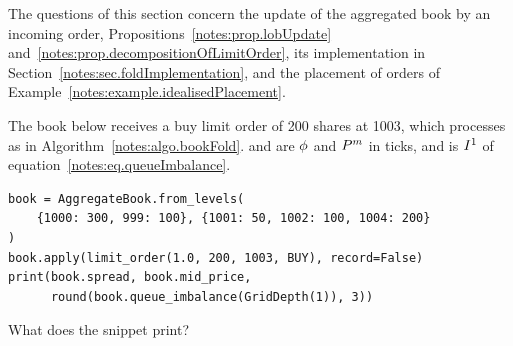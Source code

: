 The questions of this section concern the update of the aggregated book by an incoming order,
Propositions~\ref{notes:prop.lobUpdate} and~\ref{notes:prop.decompositionOfLimitOrder},
its implementation in Section~\ref{notes:sec.foldImplementation},
and the placement of orders of Example~\ref{notes:example.idealisedPlacement}.

\begin{question}
\label{question.limitBuyRestsInsideTheSpread}
The book below receives a buy limit order of 200 shares at 1003,
which  processes as in Algorithm~\ref{notes:algo.bookFold}.
 and  are $\LOBspread$ and $\midPrice$ in ticks,
and  is $\queueImbalance[1]$
of equation~\eqref{notes:eq.queueImbalance}.
\begin{lstlisting}[caption={A buy limit order, and three quantities of the book it leaves}, label=listing.limitBuyRestsInsideTheSpread]
book = AggregateBook.from_levels(
    {1000: 300, 999: 100}, {1001: 50, 1002: 100, 1004: 200}
)
book.apply(limit_order(1.0, 200, 1003, BUY), record=False)
print(book.spread, book.mid_price,
      round(book.queue_imbalance(GridDepth(1)), 3))
\end{lstlisting}
What does the snippet print?
\begin{choices}
 \choice {}
 \choice {}
 \correctchoice {}
 \choice {}
 \choice {}
\end{choices}
\end{question}

